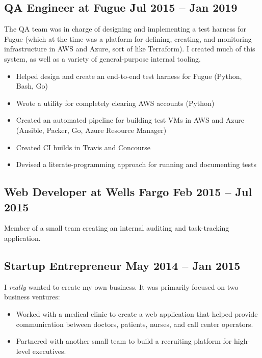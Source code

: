 \documentclass[12pt]{article}
\begin{document}
\subsection*{QA Engineer at Fugue \hfill Jul 2015 -- Jan 2019}

The QA team was in charge of designing and implementing a test harness for Fugue
(which at the time was a platform for defining, creating, and monitoring
infrastructure in AWS and Azure, sort of like Terraform). I created much of this
system, as well as a variety of general-purpose internal tooling.

\begin{itemize}
\item Helped design and create an end-to-end test harness for Fugue (Python,
  Bash, Go)
\item Wrote a utility for completely clearing AWS accounts (Python)
\item Created an automated pipeline for building test VMs in AWS and Azure
  (Ansible, Packer, Go, Azure Resource Manager)
\item Created CI builds in Travis and Concourse
\item Devised a literate-programming approach for running and documenting tests
\end{itemize}

     
   

\subsection*{Web Developer at Wells Fargo \hfill Feb 2015 -- Jul 2015}

Member of a small team creating an internal auditing and task-tracking
application.

    

\subsection*{Startup Entrepreneur \hfill May 2014 -- Jan 2015}

I \textit{really} wanted to create my own business. It was primarily focused on
two business ventures:

\begin{itemize}
\item Worked with a medical clinic to create a web application that helped
  provide communication between doctors, patients, nurses, and call center
  operators.

\item Partnered with another small team to build a recruiting platform for
  high-level executives.
\end{itemize}
\end{document}
